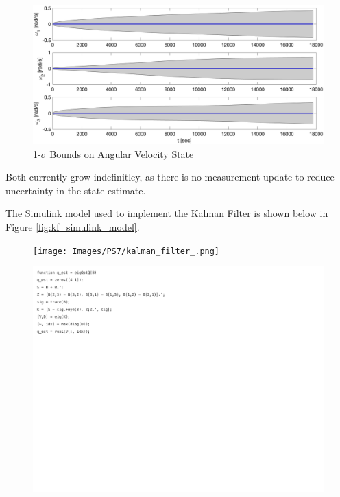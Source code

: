 \begin{figure}[H]
    \centering
    \captionsetup{ justification = centering}
    \includegraphics[width = 15cm]{Images/PS7/kalman_filter_omega_cov_bounds.png}
    \caption{1-$\sigma$ Bounds on Angular Velocity State}
    \label{fig:kf_time_update_vel_statistics}
\end{figure}

Both currently grow indefinitley, as there is no measurement update to reduce uncertainty in the state estimate.

The Simulink model used to implement the Kalman Filter is shown below in Figure \ref{fig:kf_simulink_model}.

\begin{figure}[H]
    \centering
    \captionsetup{ justification = centering }
    \texttt{[image: Images/PS7/kalman\_filter\_.png]}
\end{figure}

\begin{figure}[H]
    \centering
    \captionsetup{ justification = centering }
    \includegraphics[trim={0cm 15cm 10cm 0cm},clip,width = 15cm]{Images/PS6/statisticalAttitude-2.png}
\end{figure}


